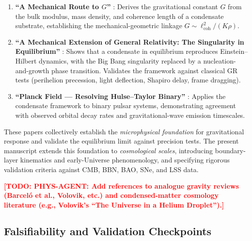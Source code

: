 \documentclass[11pt,a4paper]{article}
\theoremstyle{definition}
\newcommand{\TODO}[1]{\textcolor{red}{\textbf{[TODO: #1]}}}
\begin{document}
\begin{enumerate}[leftmargin=2.2em]
  \item \textbf{``A Mechanical Route to $G$''} \cite{SkavbergMechG2025}: Derives the gravitational constant $G$ from the bulk modulus, mass density, and coherence length of a condensate substrate, establishing the mechanical-geometric linkage $G \sim \ell_{\mathrm{coh}}^2 / (K \rho)$.
  \item \textbf{``A Mechanical Extension of General Relativity: The Singularity in Equilibrium''} \cite{SkavbergMechGR2025}: Shows that a condensate in equilibrium reproduces Einstein--Hilbert dynamics, with the Big Bang singularity replaced by a nucleation-and-growth phase transition. Validates the framework against classical GR tests (perihelion precession, light deflection, Shapiro delay, frame dragging).
  \item \textbf{``Planck Field --- Resolving Hulse--Taylor Binary''} \cite{SkavbergPlanckField2025}: Applies the condensate framework to binary pulsar systems, demonstrating agreement with observed orbital decay rates and gravitational-wave emission timescales.
\end{enumerate}

These papers collectively establish the \emph{microphysical foundation} for gravitational response and validate the equilibrium limit against precision tests. The present manuscript extends this foundation to \emph{cosmological scales}, introducing boundary-layer kinematics and early-Universe phenomenology, and specifying rigorous validation criteria against CMB, BBN, BAO, SNe, and LSS data.

\TODO{PHYS-AGENT: Add references to analogue gravity reviews (Barceló et al., Volovik, etc.) and condensed-matter cosmology literature (e.g., Volovik's ``The Universe in a Helium Droplet'').}

\subsection{Falsifiability and Validation Checkpoints}
\label{sec:falsifiability}
\end{document}
